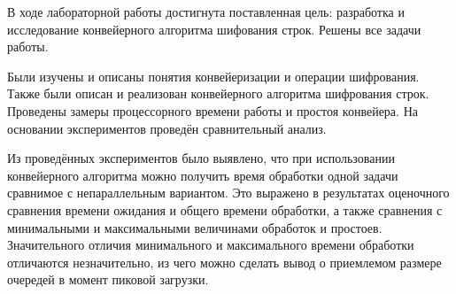 В ходе лабораторной работы достигнута поставленная цель: разработка и исследование конвейерного алгоритма шифования строк. Решены все задачи работы.

Были изучены и описаны понятия конвейеризации и операции шифрования. Также были описан и реализован конвейерного алгоритма шифрования строк. Проведены замеры процессорного времени работы и простоя конвейера. На основании экспериментов проведён сравнительный анализ.

Из проведённых экспериментов было выявлено, что при использовании конвейерного алгоритма можно получить время обработки одной задачи сравнимое с непараллельным вариантом. Это выражено в результатах оценочного сравнения времени ожидания и общего времени обработки, а также сравнения с минимальными и максимальными величинами обработок и простоев. Значительного отличия минимального и максимального времени обработки отличаются незначительно, из чего можно сделать вывод о приемлемом размере очередей в момент пиковой загрузки.